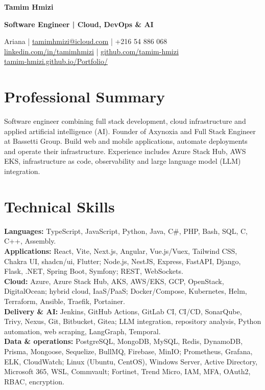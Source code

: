 \documentclass[11pt,a4paper]{article}
\begin{document}
{\fontsize{25}{28}\selectfont\textbf{\color{accent}Tamim Hmizi}}\par
{\large\textbf{Software Engineer | Cloud, DevOps \& AI}}\par
Ariana | \href{mailto:tamimhmizi@icloud.com}{tamimhmizi@icloud.com} | +216 54 886 068\\
\href{https://www.linkedin.com/in/tamimhmizi/}{linkedin.com/in/tamimhmizi} | \href{https://github.com/tamim-hmizi}{github.com/tamim-hmizi}\\
\href{https://tamim-hmizi.github.io/Portfolio/}{tamim-hmizi.github.io/Portfolio/}

\section{Professional Summary}
Software engineer combining full stack development, cloud infrastructure and applied artificial intelligence (AI). Founder of Axynoxia and Full Stack Engineer at Bassetti Group. Build web and mobile applications, automate deployments and operate their infrastructure. Experience includes Azure Stack Hub, AWS EKS, infrastructure as code, observability and large language model (LLM) integration.

\section{Technical Skills}
\textbf{Languages:} TypeScript, JavaScript, Python, Java, C\#, PHP, Bash, SQL, C, C++, Assembly.\\
\textbf{Applications:} React, Vite, Next.js, Angular, Vue.js/Vuex, Tailwind CSS, Chakra UI, shadcn/ui, Flutter; Node.js, NestJS, Express, FastAPI, Django, Flask, .NET, Spring Boot, Symfony; REST, WebSockets.\\
\textbf{Cloud:} Azure, Azure Stack Hub, AKS, AWS/EKS, GCP, OpenStack, DigitalOcean; hybrid cloud, IaaS/PaaS; Docker/Compose, Kubernetes, Helm, Terraform, Ansible, Traefik, Portainer.\\
\textbf{Delivery \& AI:} Jenkins, GitHub Actions, GitLab CI, CI/CD, SonarQube, Trivy, Nexus, Git, Bitbucket, Gitea; LLM integration, repository analysis, Python automation, web scraping, LangGraph, Temporal.\\
\textbf{Data \& operations:} PostgreSQL, MongoDB, MySQL, Redis, DynamoDB, Prisma, Mongoose, Sequelize, BullMQ, Firebase, MinIO; Prometheus, Grafana, ELK, CloudWatch; Linux (Ubuntu, CentOS), Windows Server, Active Directory, Microsoft 365, WSL, Commvault; Fortinet, Trend Micro, IAM, MFA, OAuth2, RBAC, encryption.
\end{document}
